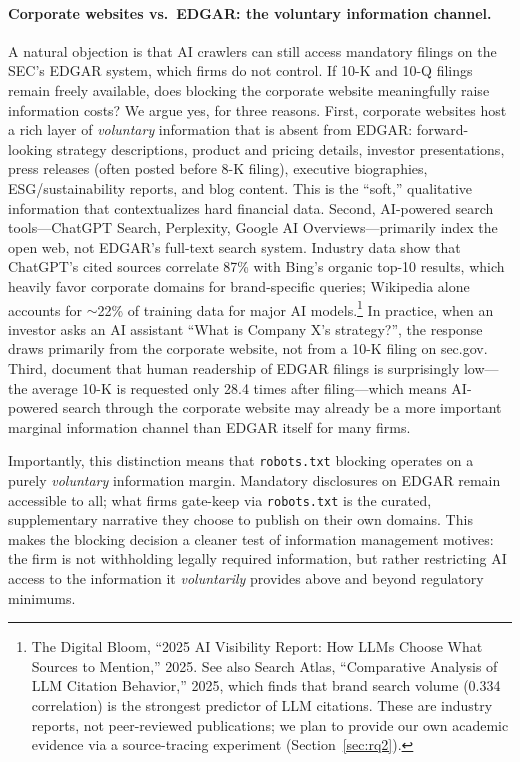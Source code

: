 \documentclass[12pt,a4paper]{article}
\begin{document}
\paragraph{Corporate websites vs.\ EDGAR: the voluntary information channel.} A natural objection is that AI crawlers can still access mandatory filings on the SEC's EDGAR system, which firms do not control. If 10-K and 10-Q filings remain freely available, does blocking the corporate website meaningfully raise information costs? We argue yes, for three reasons. First, corporate websites host a rich layer of \emph{voluntary} information that is absent from EDGAR: forward-looking strategy descriptions, product and pricing details, investor presentations, press releases (often posted before 8-K filing), executive biographies, ESG/sustainability reports, and blog content. This is the ``soft,'' qualitative information that contextualizes hard financial data. Second, AI-powered search tools---ChatGPT Search, Perplexity, Google AI Overviews---primarily index the open web, not EDGAR's full-text search system. Industry data show that ChatGPT's cited sources correlate 87\% with Bing's organic top-10 results, which heavily favor corporate domains for brand-specific queries; Wikipedia alone accounts for $\sim$22\% of training data for major AI models.\footnote{The Digital Bloom, ``2025 AI Visibility Report: How LLMs Choose What Sources to Mention,'' 2025. See also Search Atlas, ``Comparative Analysis of LLM Citation Behavior,'' 2025, which finds that brand search volume (0.334 correlation) is the strongest predictor of LLM citations. These are industry reports, not peer-reviewed publications; we plan to provide our own academic evidence via a source-tracing experiment (Section~\ref{sec:rq2}).} In practice, when an investor asks an AI assistant ``What is Company X's strategy?'', the response draws primarily from the corporate website, not from a 10-K filing on sec.gov. Third, \citet{LoughranMcDonald2017} document that human readership of EDGAR filings is surprisingly low---the average 10-K is requested only 28.4 times after filing---which means AI-powered search through the corporate website may already be a more important marginal information channel than EDGAR itself for many firms.

Importantly, this distinction means that \texttt{robots.txt} blocking operates on a purely \emph{voluntary} information margin. Mandatory disclosures on EDGAR remain accessible to all; what firms gate-keep via \texttt{robots.txt} is the curated, supplementary narrative they choose to publish on their own domains. This makes the blocking decision a cleaner test of information management motives: the firm is not withholding legally required information, but rather restricting AI access to the information it \emph{voluntarily} provides above and beyond regulatory minimums.
\end{document}
